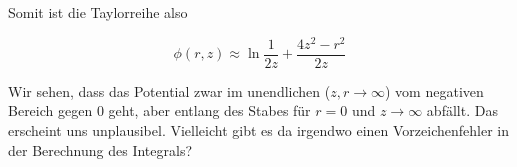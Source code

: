 \documentclass[a4paper,german,12pt,smallheadings]{scrartcl}
\begin{document}
\begin{enumerate}[a)]
    Somit ist die Taylorreihe also

    \begin{equation}
      \phi(r, z) \approx \ln \frac{1}{2z} + \frac{4z^2 - r^2}{2z}
    \end{equation}


    Wir sehen, dass das Potential zwar im unendlichen ($z,r \to \infty$) vom negativen Bereich
    gegen $0$ geht, aber entlang des Stabes für $r=0$ und $z \to \infty$
    abfällt. Das erscheint uns unplausibel. Vielleicht gibt es da irgendwo
    einen Vorzeichenfehler in der Berechnung des Integrals?




\end{enumerate}
\end{document}
